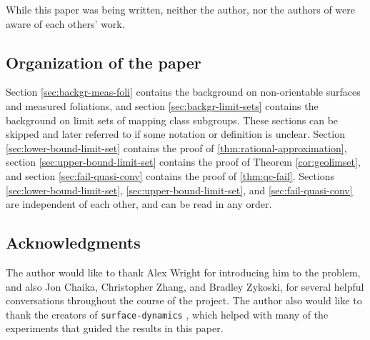 While this paper was being written, neither the author, nor the authors of \cite{erlandsson2021mapping} were aware of each others' work.

\subsection*{Organization of the paper}
Section \ref{sec:backgr-meas-foli} contains the background on non-orientable surfaces and measured foliations, and section \ref{sec:backgr-limit-sets} contains the background on limit sets of mapping class subgroups.
These sections can be skipped and later referred to if some notation or definition is unclear.
Section \ref{sec:lower-bound-limit-set} contains the proof of \autoref{thm:rational-approximation}, section \ref{sec:upper-bound-limit-set} contains the proof of Theorem \ref{cor:geolimset}, and section \ref{sec:fail-quasi-conv} contains the proof of \autoref{thm:qc-fail}.
Sections \ref{sec:lower-bound-limit-set}, \ref{sec:upper-bound-limit-set}, and \ref{sec:fail-quasi-conv} are independent of each other, and can be read in any order.

\subsection*{Acknowledgments}
The author would like to thank Alex Wright for introducing him to the problem, and also Jon Chaika, Christopher Zhang, and Bradley Zykoski, for several helpful conversations throughout the course of the project.
The author also would like to thank the creators of \texttt{surface-dynamics} \cite{vincent_delecroix_2021_5057590}, which helped with many of the experiments that guided the results in this paper.


